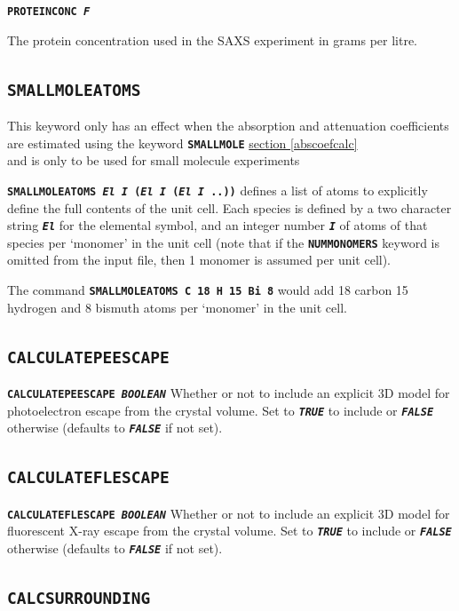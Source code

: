 \documentclass[a4paper]{article}
\newcommand{\Keyword}[1]{\texttt{\textbf{#1}}\xspace}
\newcommand{\SB}{\\[0.2em]}
\begin{document}
\noindent \Keyword{PROTEINCONC \textit{F}}

The protein concentration used in the SAXS experiment in grams per litre.


\subsection{\Keyword{SMALLMOLEATOMS}}
\label{amallmoleatoms}
This keyword only has an effect when the absorption and attenuation coefficients are estimated using the keyword \Keyword{SMALLMOLE} \hyperref[abscoefcalc]{section \ref*{abscoefcalc}\SB} and is only to be used for small molecule experiments

\noindent \Keyword{SMALLMOLEATOMS \textit{El I} (\textit{El I} (\textit{El I} ..))}
defines a list of atoms to explicitly define the full contents of the unit cell. Each species is defined by a two character string \Keyword{\textit{El}} for the elemental symbol, and an integer number \Keyword{\textit{I}} of atoms of that species per `monomer' in the unit cell (note that if the  \Keyword{NUMMONOMERS} keyword is omitted from the input file, then 1 monomer is assumed per unit cell).

The command \Keyword{SMALLMOLEATOMS C 18 H 15 Bi 8} would add 18 carbon 15 hydrogen and 8 bismuth atoms per `monomer' in the unit cell.

\subsection{\Keyword{CALCULATEPEESCAPE}}
\label{calculatepeescape}

\noindent \Keyword{CALCULATEPEESCAPE \textit{BOOLEAN}}
Whether or not to include an explicit 3D model for photoelectron escape from the crystal volume. Set to \Keyword{\textit{TRUE}} to include or \Keyword{\textit{FALSE}} otherwise (defaults to \Keyword{\textit{FALSE}} if not set). 

\subsection{\Keyword{CALCULATEFLESCAPE}}
\label{calculateflescape}

\noindent \Keyword{CALCULATEFLESCAPE \textit{BOOLEAN}}
Whether or not to include an explicit 3D model for fluorescent X-ray escape from the crystal volume. Set to \Keyword{\textit{TRUE}} to include or \Keyword{\textit{FALSE}} otherwise (defaults to \Keyword{\textit{FALSE}} if not set).

\subsection{\Keyword{CALCSURROUNDING}}
\label{calcsurrounding}
\end{document}
